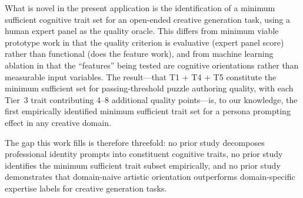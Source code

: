 What is novel in the present application is the identification of a minimum sufficient cognitive trait set for an open-ended creative generation task, using a human expert panel as the quality oracle. This differs from minimum viable prototype work in that the quality criterion is evaluative (expert panel score) rather than functional (does the feature work), and from machine learning ablation in that the ``features'' being tested are cognitive orientations rather than measurable input variables. The result---that T1 + T4 + T5 constitute the minimum sufficient set for passing-threshold puzzle authoring quality, with each Tier~3 trait contributing 4--8 additional quality points---is, to our knowledge, the first empirically identified minimum sufficient trait set for a persona prompting effect in any creative domain.

The gap this work fills is therefore threefold: no prior study decomposes professional identity prompts into constituent cognitive traits, no prior study identifies the minimum sufficient trait subset empirically, and no prior study demonstrates that domain-naive artistic orientation outperforms domain-specific expertise labels for creative generation tasks.
